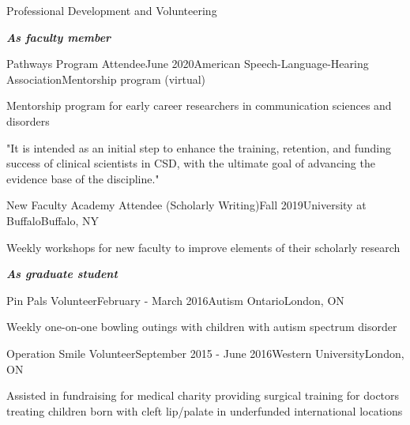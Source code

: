 \documentclass{resume} %
\begin{document}
\begin{rSection}{Professional Development and Volunteering}

\bigskip
\begin{center}
	{\bf \emph{As faculty member}}\\
\end{center}

	\begin{rSubsection}{Pathways Program Attendee}{June 2020}{American Speech-Language-Hearing Association}{Mentorship program (virtual)}
		\item Mentorship program for early career researchers in communication sciences and disorders
		\item "It is intended as an initial step to enhance the training, retention, and funding success of clinical scientists in CSD, with the ultimate goal of advancing the evidence base of the discipline."
	\end{rSubsection}

	\begin{rSubsection}{New Faculty Academy Attendee (Scholarly Writing)}{Fall 2019}{University at Buffalo}{Buffalo, NY}
		\item Weekly workshops for new faculty to improve elements of their scholarly research
	\end{rSubsection}

\bigskip
\begin{center}
	{\bf \emph{As graduate student}}\\
\end{center}

	\begin{rSubsection}{Pin Pals Volunteer}{February - March 2016}{Autism Ontario}{London, ON}
	\item Weekly one-on-one bowling outings with children with autism spectrum disorder
	
	\end{rSubsection}
	
	
	\begin{rSubsection}{Operation Smile Volunteer}{September 2015 - June 2016}{Western University}{London, ON}
	\item Assisted in fundraising for medical charity providing surgical training for doctors treating children born with cleft lip/palate in underfunded international locations
	
	\end{rSubsection}
	

\end{rSection}
\end{document}

